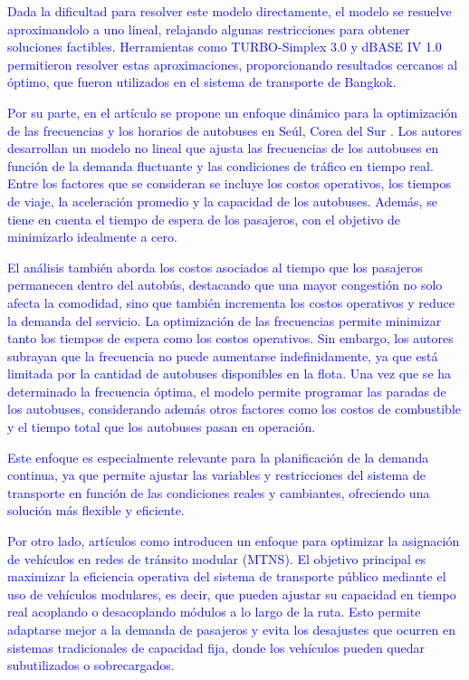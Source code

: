 \documentclass[preprint,11pt]{elsarticle}
\newcommand{\Blue}[1]{\textcolor{blue}{#1}}
\begin{document}
 \Blue{Dada la dificultad para resolver este modelo directamente, el modelo se resuelve aproximandolo a uno lineal, relajando algunas restricciones para obtener soluciones factibles. Herramientas como TURBO-Simplex 3.0 y dBASE IV 1.0 permitieron resolver estas aproximaciones, proporcionando resultados cercanos al óptimo, que fueron utilizados en el sistema de transporte de Bangkok.}

\Blue{Por su parte, en el artículo \cite{kim2009} se propone un enfoque dinámico para la optimización de las frecuencias y los horarios de autobuses en Seúl, Corea del Sur \cite{kim2009}. Los autores desarrollan un modelo no lineal que ajusta las frecuencias de los autobuses en función de la demanda fluctuante y las condiciones de tráfico en tiempo real. Entre los factores que se consideran  se incluye los costos operativos, los tiempos de viaje, la aceleración promedio y la capacidad de los autobuses. Además, se tiene en cuenta el tiempo de espera de los pasajeros, con el objetivo de minimizarlo idealmente a cero.}

\Blue{El análisis también aborda los costos asociados al tiempo que los pasajeros permanecen dentro del autobús, destacando que una mayor congestión no solo afecta la comodidad, sino que también incrementa los costos operativos y reduce la demanda del servicio. La optimización de las frecuencias permite minimizar tanto los tiempos de espera como los costos operativos. Sin embargo, los autores subrayan que la frecuencia no puede aumentarse indefinidamente, ya que está limitada por la cantidad de autobuses disponibles en la flota. Una vez que se ha determinado la frecuencia óptima, el modelo permite programar las paradas de los autobuses, considerando además otros factores como los costos de combustible y el tiempo total que los autobuses pasan en operación.}

\Blue{Este enfoque es especialmente relevante para la planificación de la demanda continua, ya que permite ajustar las variables y restricciones del sistema de transporte en función de las condiciones reales y cambiantes, ofreciendo una solución más flexible y eficiente.}

\Blue{Por otro lado, artículos como \cite{guan2023,chen2019} introducen un enfoque para optimizar la asignación de vehículos en redes de tránsito modular (MTNS). El objetivo principal es maximizar la eficiencia operativa del sistema de transporte público mediante el uso de vehículos modulares, es decir,  que pueden ajustar su capacidad en tiempo real acoplando o desacoplando módulos a lo largo de la ruta. Esto permite adaptarse mejor a la demanda de pasajeros y evita los desajustes que ocurren en sistemas tradicionales de capacidad fija, donde los vehículos pueden quedar subutilizados o sobrecargados.}
\end{document}
